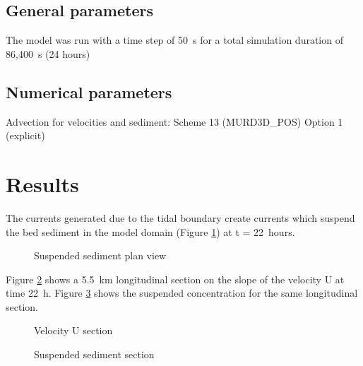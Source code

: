 \subsection{General parameters}
%
The model was run with a time step of 50~s for a total simulation
duration of 86,400~s (24 hours)
%
%
%
\subsection{Numerical parameters}
%
Advection for velocities and sediment: Scheme 13 (MURD3D\_POS) Option 1 (explicit)
%
%
%
%
\section{Results}
%
The currents generated due to the tidal boundary create currents which suspend the 
bed sediment in the model domain (Figure \ref{sedplanview}) at t = 22~hours.

\begin{figure} [h]
\centering
{}
\caption{Suspended sediment plan view}\label{sedplanview}
\end{figure}

Figure \ref{velsection} shows a 5.5~km longitudinal section on the slope of the velocity U at time
22~h. Figure \ref{sscsection} shows the suspended concentration for the same longitudinal section.

\begin{figure} [h]
\centering
{}
\caption{Velocity U section}\label{velsection}
\end{figure}

\begin{figure} [h]
\centering
{}
\caption{Suspended sediment section}\label{sscsection}
\end{figure}

